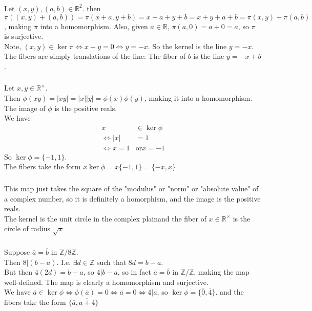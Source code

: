 \documentclass{article}
\newcommand{\ints}{\mathbb{Z}}
\newcommand{\reals}{\mathbb{R}}
\newcommand{\set}[1]{ \{ #1 \} }
\newcommand{\abs}[1]{| #1 |}
\renewcommand{\bar}{\overline}
\newcommand{\divides}{\big\vert}
\begin{document}
\subsubsection{}\label{ex1p7}
Let $(x,y),(a,b)\in\reals^{2}$. then $\pi((x,y)+(a,b))=\pi(x+a,y+b)=x+a+y+b=x+y+a+b = \pi(x,y)+\pi(a,b)$, making $\pi$ into a homomorphism. Also, given $a\in\reals$, $\pi(a,0) = a+0 = a$, so $\pi$ is surjective.\\
Note, $(x,y)\in\ker\pi \iff x+y=0 \iff y=-x$. So the kernel is the line $y=-x$. The fibers are simply translations of the line: The fiber of $b$ is the line $y=-x+b$.
\subsubsection{}\label{ex1p8}
Let $x,y\in\reals^{\times}$.\\
Then $\phi(xy) = \abs{xy} = \abs{x}\abs{y} = \phi(x)\phi(y)$, making it into a homomorphism. The image of $\phi$ is the positive reals.\\
We have 
\begin{align*}
x&\in\ker\phi \\
\iff \abs{x} &= 1\\
\iff x=1 &\mbox{or} x=-1
\end{align*}
So $\ker\phi=\set{-1,1}$.\\
The fibers take the form $x\ker\phi=x\set{-1,1}=\set{-x,x}$
\subsubsection{}\label{ex1p9}
This map just takes the square of the "modulus" or "norm" or "absolute value" of a complex number, so it is definitely a homorphism, and the image is the positive reals.\\
The kernel is the unit circle in the complex plainand the fiber of $x \in \reals^{\times}$ is the circle of radius $\sqrt{x}$
\subsubsection{}\label{ex1p10}
Suppose $\bar{a} = \bar{b}$ in $\ints/8\ints$.\\
Then $8\divides(b-a)$. I.e. $\exists d \in \ints$ such that $8d=b-a$.\\
But then $4(2d) = b-a$, so $4\divides b-a$, so in fact $\bar{a}=\bar{b}$ in $\ints/\ints$, making the map well-defined. The map is clearly a homomorphism and surjective.\\
We have $\bar{a} \in \ker\phi \iff \phi(\bar{a})=0 \iff \bar{a}=0 \iff 4\divides a$, so $\ker\phi=\set{\bar{0},\bar{4}}$. and the fibers take the form $\set{\bar{a},\bar{a+4}}$
\end{document}
